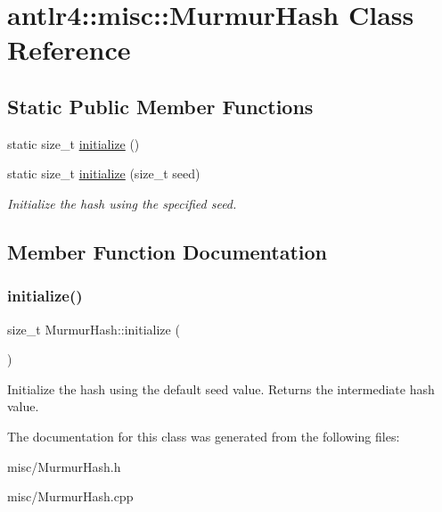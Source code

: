 \hypertarget{classantlr4_1_1misc_1_1MurmurHash}{}\section{antlr4\+:\+:misc\+:\+:Murmur\+Hash Class Reference}
\label{classantlr4_1_1misc_1_1MurmurHash}
\subsection*{Static Public Member Functions}
\begin{DoxyCompactItemize}
\item 
static size\+\_\+t \hyperlink{classantlr4_1_1misc_1_1MurmurHash_af97273b2763fc46f8ad80160863614a9}{initialize} ()
\item 
\mbox{\label{classantlr4_1_1misc_1_1MurmurHash_a18efedac23dc5b9dd3f6487cfc010af9}} 
static size\+\_\+t \hyperlink{classantlr4_1_1misc_1_1MurmurHash_a18efedac23dc5b9dd3f6487cfc010af9}{initialize} (size\+\_\+t seed)
\begin{DoxyCompactList}\small\item\em Initialize the hash using the specified seed. \end{DoxyCompactList}\end{DoxyCompactItemize}


\subsection{Member Function Documentation}
\mbox{\label{classantlr4_1_1misc_1_1MurmurHash_af97273b2763fc46f8ad80160863614a9}} 
\subsubsection{\texorpdfstring{initialize()}{initialize()}}
{\footnotesize\ttfamily size\+\_\+t Murmur\+Hash\+::initialize (\begin{DoxyParamCaption}{ }\end{DoxyParamCaption})\hspace{0.3cm}{\ttfamily [static]}}

Initialize the hash using the default seed value. Returns the intermediate hash value. 

The documentation for this class was generated from the following files\+:\begin{DoxyCompactItemize}
\item 
misc/Murmur\+Hash.\+h\item 
misc/Murmur\+Hash.\+cpp\end{DoxyCompactItemize}
